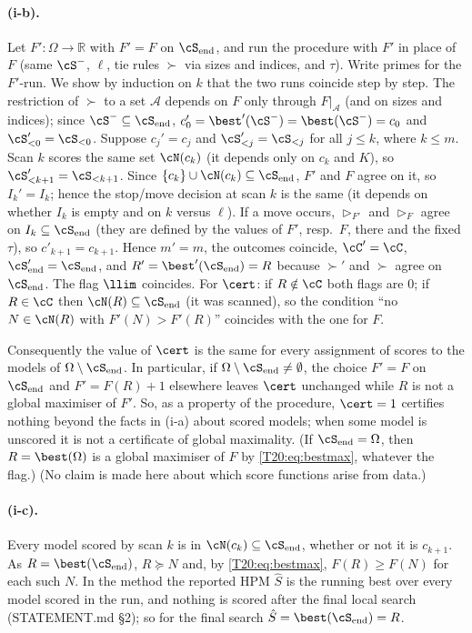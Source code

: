 \documentclass[11pt]{report}
\begin{document}
\paragraph{(i-b).}
Let $F':\Omega\to\mathbb{R}$ with $F'=F$ on $\cS_{\rm end}$, and run the procedure with $F'$ in place of $F$ (same $\cS^-$, $\ell$, tie rules $\succ$ via sizes and indices, and $\tau$). Write primes for the $F'$-run. We show by induction on $k$ that the two runs coincide step by step. The restriction of $\succ$ to a set $\mathcal A$ depends on $F$ only through $F|_{\mathcal A}$ (and on sizes and indices); since $\cS^-\subseteq\cS_{\rm end}$, $c_0'=\best'(\cS^-)=\best(\cS^-)=c_0$ and $\cS'_{<0}=\cS_{<0}$. Suppose $c_j'=c_j$ and $\cS'_{<j}=\cS_{<j}$ for all $j\le k$, where $k\le m$. Scan $k$ scores the same set $\cN(c_k)$ (it depends only on $c_k$ and $K$), so $\cS'_{<k+1}=\cS_{<k+1}$. Since $\{c_k\}\cup\cN(c_k)\subseteq\cS_{\rm end}$, $F'$ and $F$ agree on it, so $I_k'=I_k$; hence the stop/move decision at scan $k$ is the same (it depends on whether $I_k$ is empty and on $k$ versus $\ell$). If a move occurs, $\rhd_{F'}$ and $\rhd_F$ agree on $I_k\subseteq\cS_{\rm end}$ (they are defined by the values of $F'$, resp.\ $F$, there and the fixed $\tau$), so $c'_{k+1}=c_{k+1}$. Hence $m'=m$, the outcomes coincide, $\cC'=\cC$, $\cS'_{\rm end}=\cS_{\rm end}$, and $R'=\best'(\cS_{\rm end})=R$ because $\succ'$ and $\succ$ agree on $\cS_{\rm end}$. The flag $\llim$ coincides. For $\cert$: if $R\notin\cC$ both flags are $0$; if $R\in\cC$ then $\cN(R)\subseteq\cS_{\rm end}$ (it was scanned), so the condition ``no $N\in\cN(R)$ with $F'(N)>F'(R)$'' coincides with the one for $F$.

Consequently the value of $\cert$ is the same for every assignment of scores to the models of $\Omega\setminus\cS_{\rm end}$. In particular, if $\Omega\setminus\cS_{\rm end}\ne\emptyset$, the choice $F'=F$ on $\cS_{\rm end}$ and $F'=F(R)+1$ elsewhere leaves $\cert$ unchanged while $R$ is not a global maximiser of $F'$. So, as a property of the procedure, $\cert=1$ certifies nothing beyond the facts in (i-a) about scored models; when some model is unscored it is not a certificate of global maximality. (If $\cS_{\rm end}=\Omega$, then $R=\best(\Omega)$ is a global maximiser of $F$ by \eqref{T20:eq:bestmax}, whatever the flag.) (No claim is made here about which score functions arise from data.)

\paragraph{(i-c).}
Every model scored by scan $k$ is in $\cN(c_k)\subseteq\cS_{\rm end}$, whether or not it is $c_{k+1}$. As $R=\best(\cS_{\rm end})$, $R\succeq N$ and, by \eqref{T20:eq:bestmax}, $F(R)\ge F(N)$ for each such $N$. In the method the reported HPM $\hat S$ is the running best over every model scored in the run, and nothing is scored after the final local search (STATEMENT.md \S2); so for the final search $\hat S=\best(\cS_{\rm end})=R$.
\end{document}
